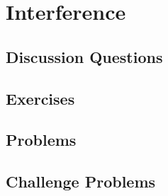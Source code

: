 
\chapter{Interference}

\section{Discussion Questions}

\section{Exercises}

\section{Problems}

\section{Challenge Problems}
